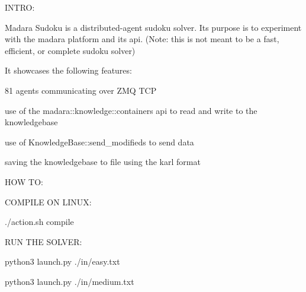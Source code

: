 I\+N\+T\+RO\+:

Madara Sudoku is a distributed-\/agent sudoku solver. It\textquotesingle{}s purpose is to experiment with the madara platform and it\textquotesingle{}s api. (Note\+: this is not meant to be a fast, efficient, or complete sudoku solver)

It showcases the following features\+:
\begin{DoxyItemize}
\item 81 agents communicating over Z\+MQ T\+CP
\item use of the madara\+::knowledge\+::containers api to read and write to the knowledgebase
\item use of Knowledge\+Base\+::send\+\_\+modifieds to send data
\item saving the knowledgebase to file using the karl format
\end{DoxyItemize}

H\+OW TO\+:

C\+O\+M\+P\+I\+LE ON L\+I\+N\+UX\+:

{\ttfamily ./action.sh compile}

R\+UN T\+HE S\+O\+L\+V\+ER\+:

{\ttfamily python3 launch.\+py ./in/easy.txt}

{\ttfamily python3 launch.\+py ./in/medium.txt}



 